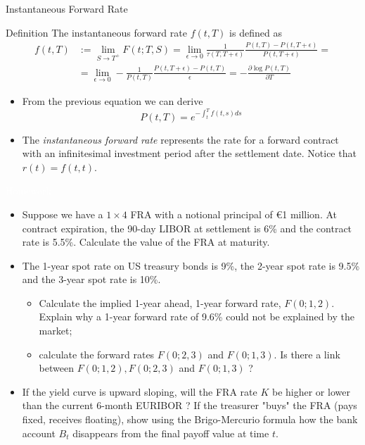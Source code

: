 \documentclass{beamer}
\begin{document}
\begin{frame}{Instantaneous Forward Rate}
	\begin{block}{Definition}
		The \textcolor{maincolor}{instantaneous forward rate} $f(t, T)$ is defined as
		\begin{equation}
			\begin{aligned}
				f(t, T) &:= \lim_{S\rightarrow T^+} F(t;T,S)
				= \lim_{\epsilon\rightarrow 0}  \frac{1}{\tau(T,T+\epsilon)}\frac{P(t,T)-P(t,T+\epsilon)}{P(t,T+\epsilon)} = \\
				& = \lim_{\epsilon\rightarrow 0} - \frac{1}{P(t,T)} \frac{P(t,T+\epsilon)-P(t,T)}{\epsilon}
				= -\frac{\partial \log P(t, T)}{\partial T}
			\end{aligned}
		\end{equation}
		\myendproof
	\end{block}
		\begin{itemize}
		\item From the previous equation we can derive
		\begin{equation}
			P(t, T) = e^{-\int_t^T f(t, s) ds}
		\end{equation}
		\item The \emph{instantaneous forward rate} represents the rate for a forward contract with an infinitesimal investment period after the settlement date.
		Notice that $r(t) = f(t,t)$.
	\end{itemize}
\end{frame}

\begin{homework}
	\begin{frame}{\textcolor{white}{Homework}}
		\begin{itemize}
			\item[white] Suppose we have a $1\times 4$ FRA with a notional principal of €1 million.  At contract expiration, the 90-day LIBOR at settlement is 6\% and the contract rate is 5.5\%. Calculate the value of the FRA at maturity.
			\item[white] The 1-year spot rate on US treasury bonds is 9\%, the 2-year spot rate is 9.5\% and the 3-year spot rate is 10\%.
			\begin{itemize}
				\item[white] Calculate the implied 1-year ahead, 1-year forward rate, $F(0;1,2)$. Explain why a 1-year forward rate of 9.6\% could not be explained by the market;
				\item[white] calculate the forward rates  $F(0; 2, 3)$ and $F(0; 1,3)$. Is there a link between $F(0;1,2),F(0;2,3)$ and $F(0;1,3)$ ?
			\end{itemize}
			\item[white] If the yield curve is upward sloping, will the FRA rate $K$ be higher or lower than the current 6-month EURIBOR ? If the treasurer "buys" the FRA (pays fixed, receives floating), show using the Brigo-Mercurio formula how the bank account $B_t$ disappears from the final payoff value at time $t$.
		\end{itemize}
	\end{frame}
\end{homework}
\end{document}
